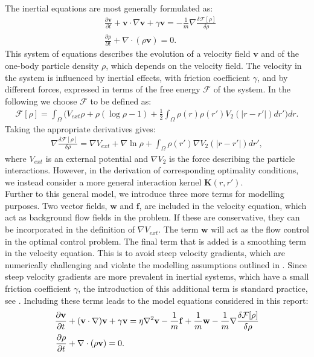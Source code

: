 \documentclass[11pt, a4paper]{article}
\theoremstyle{definition}
\newcommand{\Sta}{\rho}
\newcommand{\Stav}{\mathbf{v}}
\newcommand{\Con}{\mathbf{f}}
\begin{document}
The inertial equations are most generally formulated as:
\begin{align*}
	&\frac{\partial \Stav}{\partial t} + \Stav \cdot \nabla \Stav + \gamma \Stav = - \frac{1}{m} \nabla \frac{\delta \mathcal{F}[\Sta]}{\delta \Sta}\\
	&\frac{\partial \Sta}{\partial t} + \nabla \cdot (\Sta \Stav) =0.
\end{align*}
This system of equations describes the evolution of a velocity field $\Stav$ and of the one-body particle density $\Sta$, which depends on the velocity field.
The velocity in the system is influenced by inertial effects, with friction coefficient $\gamma$, and by different forces, expressed in terms of the free energy $\mathcal{F}$ of the system.
In the following we choose $\mathcal{F}$ to be defined as:
\begin{align}
\label{eqn:freeenergy1}
\mathcal{F}[\Sta]=\int_\Omega  \bigg( V_{ext}\Sta + \Sta (\log \Sta -1) +  \frac{1}{2}\int_\Omega \Sta(r) \Sta(r')V_2(|r-r'|)dr' \bigg) dr.
\end{align}
Taking the appropriate derivatives gives:
\begin{align*}
 \nabla \frac{\delta \mathcal{F}[\Sta]}{\delta \Sta} = \nabla V_{ext} + \nabla \ln \Sta + \int_\Omega \Sta(r') \nabla V_2(|r-r'|)dr',
\end{align*}
where $V_{ext}$ is an external potential and $\nabla V_2$ is the force describing the particle interactions. However, in the derivation of corresponding optimality conditions, we instead consider a more general interaction kernel $\mathbf{K}(r,r')$.
\\
Further to this general model, we introduce three more terms for modelling purposes. Two vector fields, $\mathbf{w}$ and $\Con$, are included in the velocity equation, which act as background flow fields in the problem. If these are conservative, they can be incorporated in the definition of $\nabla V_{ext}$. The term $\mathbf{w}$ will act as the flow control in the optimal control problem.
The final term that is added is a smoothing term in the velocity equation. This is to avoid steep velocity gradients, which are numerically challenging and violate the modelling assumptions outlined in \cite{Archer1}. Since steep velocity gradients are more prevalent in inertial systems, which have a small friction coefficient $\gamma$, the introduction of this additional term is standard practice, see \cite{Archer1}.
Including these terms leads to the model equations considered in this report:
\begin{align}
\label{eqn:INeqns1}
\frac{\partial \Stav}{\partial t} &+ (\Stav \cdot \nabla)\Stav + \gamma \Stav=\eta \nabla^2 \Stav  -\frac{1}{m}\Con +\frac{1}{m}\mathbf{w} - \frac{1}{m}\nabla \frac{\delta \mathcal{F}[\Sta]}{\delta \Sta}\\
\frac{\partial \Sta}{\partial t} &+ \nabla \cdot (\Sta \Stav)=0. \notag
\end{align}
\end{document}
